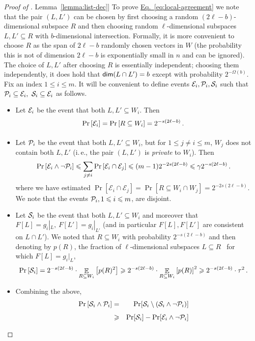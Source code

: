 \documentclass[11pt]{article}
\numberwithin{equation}{section}
\theoremstyle{definition}
\theoremstyle{plain}
\newcommand{\ie}{i.\,e.}
\newcommand{\expref}[2]{\hyperref[#2]{#1~\ref{#2}}}
\newcommand{\expeqref}[2]{\hyperref[#2]{#1~\eqref{#2}}}
\newcommand\Prob[2]{{\Pr_{#1}\left[ {#2} \right]}}
\newcommand\Expect[2]{{\mathop{\mathbb{E}}_{#1}\left[ {#2} \right]}}
\renewcommand\geq{\geqslant}
\renewcommand\ge{\geqslant}
\renewcommand\leq{\leqslant}
\renewcommand\le{\leqslant}
\def\cE{\mathcal{E}}
\begin{document}
\begin{proof}[Proof of \expref{Lemma}{lemma:list-dec}]
To prove \expeqref{Eq.}{eq:local-agreement} we note that the pair $(L, L')$ can be chosen by first choosing a random $(2\ell-b)$-dimensional subspace $R$ and then choosing random $\ell$-dimensional subspaces
$L, L' \subseteq R$ with $b$-dimensional intersection.
Formally, it is more convenient to choose $R$ as the span of $2\ell-b$ randomly chosen vectors
in $W$ (the probability this is not of dimension $2\ell-b$ is exponentially small in $n$ and can be ignored).%
The choice of $L, L'$ after choosing $R$ is essentially independent;
choosing them independently,  it does hold
that ${\sf dim}(L \cap L') = b$ except with probability $2^{-\Omega(b)}$. Fix an index $1 \leq i \leq m$. It will be convenient to define events
${\cal E}_i,  {\cal P}_i, {\cal S}_i$ such that ${\cal P}_i \subseteq {\cal E}_i, ~{\cal S}_i \subseteq {\cal E}_i$  as follows.
\begin{itemize}
\item Let ${\cal E}_i$ be the event that both $L, L' \subseteq W_i$. Then
\[
\Prob{}{ {\cal E}_i} = \Prob{}{R \subseteq W_i} = 2^{-s(2\ell-b)}\,.
\]
\item Let ${\cal P}_i$ be the event that both $L, L' \subseteq W_i$, but for $1 \leq j \not= i \leq m$, $W_j$ does not contain both $L, L'$ (\ie,
      the pair $(L, L')$ is {\it private} to $W_i$).
Then
       \[\Prob{}{ \cE_i \wedge \neg{\cal P}_i} \leq \sum_{j\not= i} \Prob{}{ {\cal E}_i \cap {\cal E}_j }  \le (m-1) 2^{-2s (2\ell-b)} \leq \gamma 2^{-s(2\ell-b)}\,.\]
      where we have estimated $\Pr[\cE_i\cap \cE_j] = \Pr[ R \subseteq W_i\cap W_j ] = 2^{-2s(2\ell-b)}$.
      We note that the events ${\cal P}_i, 1 \leq i \leq m$, are disjoint.
\item Let ${\cal S}_i$ be the event that both $L, L' \subseteq W_i$ and moreover that $F[L] = g_i|_L, ~F[L'] = g_i|_{L'}$ (and in particular
      $F[L], F[L']$ are consistent on $L \cap L'$). We noted that $R \subseteq W_i$ with probability $2^{-s(2\ell-b)}$ and then denoting by
 $p(R)$, the fraction of $\ell$-dimensional subspaces $L \subseteq R$ ~for which $F[L] = g_i|_L$,
       \[\Prob{}{{\cal S}_i} =  2^{-s(2\ell-b)}\cdot \Expect{R \subseteq W_i}{p(R)^2} \geq  2^{-s(2\ell-b)}\cdot \Expect{R \subseteq W_i}{p(R)}^2 \geq  2^{-s(2\ell-b)}\cdot \tau^2\,. \]
\item Combining the above,
\begin{eqnarray*}
\Prob{}{ {\cal S}_i \wedge {\cal P}_i } &=& \Pr[ {\cal S}_i \setminus ({\cal S}_i \wedge \neg {\cal P}_i )] \\
&\ge& \Pr[{\cal S}_i]
 - \Pr[\cE_i \wedge\neg{\cal P}_i] \\

\end{eqnarray*}
\end{itemize}
\end{proof}
\end{document}
